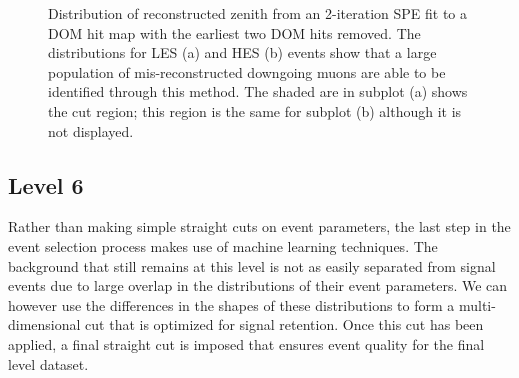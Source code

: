 \documentclass{gatech-thesis}
\begin{document}
\begin{figure}
\centering
{}
\caption[L5 SPE2 Early Removed Zenith Reconstruction]{Distribution of reconstructed zenith from an 2-iteration SPE fit to a DOM hit map with the earliest two DOM hits removed. The distributions for LES (a) and HES (b) events show that a large population of mis-reconstructed downgoing muons are able to be identified through this method. The shaded are in subplot (a) shows the cut region; this region is the same for subplot (b) although it is not displayed.}
\label{fig:NoEarlySPE2}
\end{figure}
\subsection{Level 6}
Rather than making simple straight cuts on event parameters, the last step in the event selection process makes use of machine learning techniques. The background that still remains at this level is not as easily separated from signal events due to large overlap in the distributions of their event parameters. We can however use the differences in the shapes of these distributions to form a multi-dimensional cut that is optimized for signal retention. Once this cut has been applied, a final straight cut is imposed that ensures event quality for the final level dataset.
\end{document}
